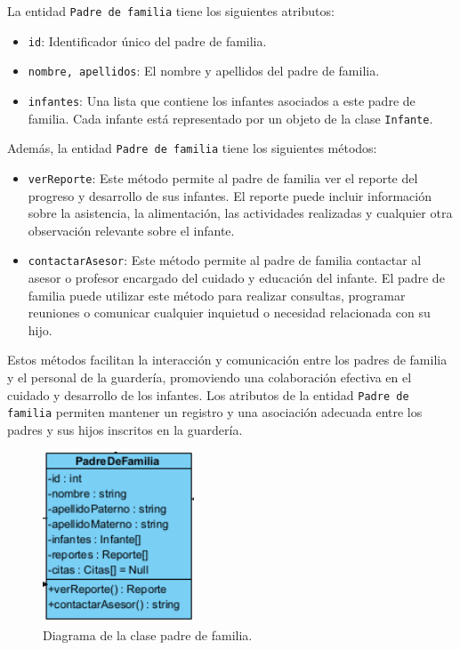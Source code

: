 La entidad \texttt{Padre de familia} tiene los siguientes atributos:

\begin{itemize}
\item \texttt{id}: Identificador único del padre de familia.
\item \texttt{nombre, apellidos}: El nombre y apellidos del padre de familia.
\item \texttt{infantes}: Una lista que contiene los infantes asociados a este padre de familia. Cada infante está representado por un objeto de la clase \texttt{Infante}.
\end{itemize}

Además, la entidad \texttt{Padre de familia} tiene los siguientes métodos:

\begin{itemize}
\item \texttt{verReporte}: Este método permite al padre de familia ver el reporte del progreso y desarrollo de sus infantes. El reporte puede incluir información sobre la asistencia, la alimentación, las actividades realizadas y cualquier otra observación relevante sobre el infante.

\item \texttt{contactarAsesor}: Este método permite al padre de familia contactar al asesor o profesor encargado del cuidado y educación del infante. El padre de familia puede utilizar este método para realizar consultas, programar reuniones o comunicar cualquier inquietud o necesidad relacionada con su hijo.

\end{itemize}

Estos métodos facilitan la interacción y comunicación entre los padres de familia y el personal de la guardería, promoviendo una colaboración efectiva en el cuidado y desarrollo de los infantes. Los atributos de la entidad \texttt{Padre de familia} permiten mantener un registro y una asociación adecuada entre los padres y sus hijos inscritos en la guardería.


\begin{figure}[htbp]
\centering
\includegraphics[width=0.4\textwidth]{images/arqui/padreFamilia.png}
\caption{Diagrama de la clase padre de familia.}
\label{fig:entidadpadre}
\end{figure}
\clearpage
